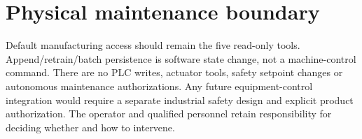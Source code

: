 \section{Physical maintenance boundary}
Default manufacturing access should remain the five read-only tools. Append/retrain/batch persistence is software state change, not a machine-control command. There are no PLC writes, actuator tools, safety setpoint changes or autonomous maintenance authorizations. Any future equipment-control integration would require a separate industrial safety design and explicit product authorization. The operator and qualified personnel retain responsibility for deciding whether and how to intervene.
